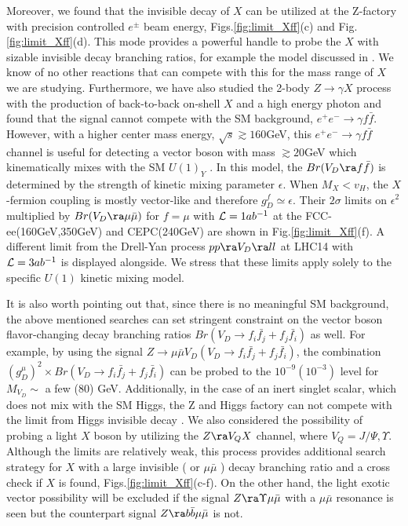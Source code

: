\documentclass[11pt]{article}
\begin{document}
 Moreover, we found  that the invisible decay of $X$  can be utilized at the Z-factory with precision controlled $e^\pm$ beam energy, Figs.\ref{fig:limit_Xff}(c) and Fig.\ref{fig:limit_Xff}(d).
This mode provides a powerful handle to probe the $X$ with sizable invisible decay branching ratios, for example the model discussed in \cite{Chang:2016pya}.
 We know of no other reactions that can compete with this for the mass range of $X$ we are studying.
Furthermore, we have also studied the 2-body $Z\to \gamma X$ process with the production of back-to-back  on-shell $X$ and a high energy photon and found that the signal cannot compete with the SM background, $e^+e^-\to \gamma f\bar{f}$.  However, with a higher center mass energy, $\sqrt{s}\gtrsim 160$GeV, this $e^+e^-\to \gamma f\bar{f}$ channel is useful for detecting a vector boson with mass $\gtrsim 20$GeV  which kinematically mixes with the SM $U(1)_Y$ \cite{He:2017zzr}.  In this model, the $Br(V_D\ra f\bar{f})$ is determined by the strength of kinetic mixing parameter $\epsilon$.
When $M_X< v_H$, the $X$-fermion coupling is mostly vector-like and therefore $g^f_D\simeq \epsilon$.
 Their $2\sigma$ limits on $\epsilon^2$ multiplied by $Br(V_D\ra \mu\bar{\mu})$ for $f=\mu$ with ${\cal L}=1 ab^{-1}$ at the FCC-ee(160GeV,350GeV) and CEPC(240GeV) are shown in Fig.\ref{fig:limit_Xff}(f). A different limit from the Drell-Yan process $pp\ra V_D\ra ll$ at LHC14 with ${\cal L}=3 ab^{-1}$\cite{Curtin:2014cca}
is displayed alongside.
 We stress that these limits apply solely to the specific $U(1)$ kinetic mixing model.

 It is also worth pointing out that, since there is no meaningful SM background, the above mentioned searches can set stringent constraint on the vector boson flavor-changing decay branching ratios $Br(V_D\to f_i\bar{f_j} +f_j \bar{f_i})$ as well. For example, by using the signal $Z\to \mu\bar{\mu} V_D(V_D\to f_i\bar{f_j} +f_j \bar{f_i})$, the combination $(g_D^\mu)^2\times Br(V_D\to f_i\bar{f_j} +f_j \bar{f_i})$ can be probed to the $10^{-9}(10^{-3})$ level for $M_{V_D}\sim$ a few ($80$) GeV.
Additionally, in the case of an inert singlet scalar, which does not mix with the SM Higgs, the Z and Higgs factory can not compete with the limit from Higgs invisible decay \cite{Aad:2015txa,CMS:2015naa}.
We also considered the possibility of probing a light $X$ boson by utilizing the $Z\ra V_Q X$ channel, where $V_Q= J/\Psi, \Upsilon$.
 Although the limits are relatively weak, this process provides additional search strategy for $X$ with  a large invisible ( or $\mu\bar{\mu}$ ) decay branching ratio  and a cross check if $X$ is found, Figs.\ref{fig:limit_Xff}(c-f).
 On the other hand, the light exotic vector possibility will be excluded if the signal $Z\ra \Upsilon \mu\bar{\mu}$ with a $\mu\bar{\mu}$ resonance is seen but the counterpart signal $Z\ra b\bar{b} \mu\bar{\mu}$ is not.
\end{document}
